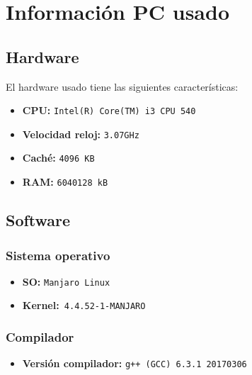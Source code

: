



\maketitle %
\newpage %
\tableofcontents %
\listoffigures
\newpage


\section{Información PC usado}

\subsection{Hardware}
El hardware usado tiene las siguientes características:
\begin{itemize}
  \item \textbf{CPU:} \texttt{Intel(R) Core(TM) i3 CPU  540}
  \item \textbf{Velocidad reloj:} \texttt{3.07GHz}
  \item \textbf{Caché:} \texttt{4096 KB}
  \item \textbf{RAM:} \texttt{6040128 kB  }
\end{itemize}
\subsection{Software}
\subsubsection{Sistema operativo}
\begin{itemize}
  \item \textbf{SO:} \texttt{Manjaro Linux}
  \item \textbf{Kernel:}\texttt{ 4.4.52-1-MANJARO}
\end{itemize}
\subsubsection{Compilador}
\begin{itemize}
  \item \textbf{Versión compilador:} \texttt{g++ (GCC) 6.3.1 20170306}
\end{itemize}

